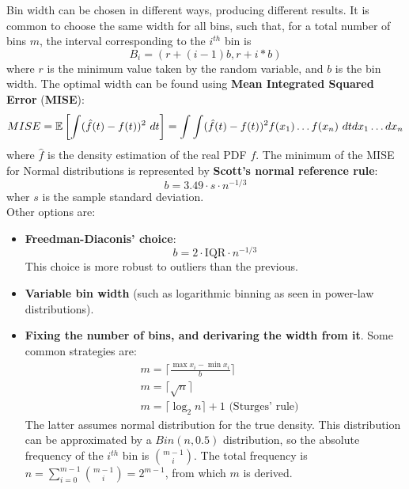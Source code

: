 Bin width can be chosen in different ways, producing different results. It is common to choose the same width for all bins, such that, for a total number of bins $m$, the interval corresponding to the $i^{th}$ bin is
\begin{equation*}
    B_i = (r + (i-1)b, r + i*b)
\end{equation*}
where $r$ is the minimum value taken by the random variable, and $b$ is the bin width. The optimal width can be found using \textbf{Mean Integrated Squared Error} (\textbf{MISE}):
\begin{equation*}
    MISE = \mathbb{E} \left [ \int (\hat{f}(t) - f(t))^2 \ dt \right ] = \int \int (\hat{f}(t) - f(t))^2 f(x_1) \ldots f(x_n) \ dt dx_1 \ldots dx_n
\end{equation*}
where $\hat{f}$ is the density estimation of the real PDF $f$. The minimum of the MISE for Normal distributions is represented by \textbf{Scott's normal reference rule}:
\begin{equation*}
    b = 3.49 \cdot s \cdot n^{-1/3}
\end{equation*}
wher $s$ is the sample standard deviation.\\
Other options are:
\begin{itemize}
    \item \textbf{Freedman-Diaconis' choice}:
    \begin{equation*}
        b = 2 \cdot \text{IQR} \cdot n^{-1/3}
    \end{equation*}
    This choice is more robust to outliers than the previous.
    \item \textbf{Variable bin width} (such as logarithmic binning as seen in power-law distributions).
    \item \textbf{Fixing the number of bins, and derivaring the width from it}. Some common strategies are:
    \begin{align*}
        &m = \lceil \frac{\max x_i - \min x_i}{b} \rceil\\
        &m = \lceil \sqrt{n} \rceil\\
        &m = \lceil \log_2 n \rceil + 1 \text{ (Sturges' rule)}
    \end{align*}
    The latter assumes normal distribution for the true density. This distribution can be approximated by a $Bin(n, 0.5)$ distribution, so the absolute frequency of the $i^{th}$ bin is $\binom{m-1}{i}$. The total frequency is $n = \sum_{i=0}^{m-1} \binom{m-1}{i} = 2^{m-1}$, from which $m$ is derived.
\end{itemize}


